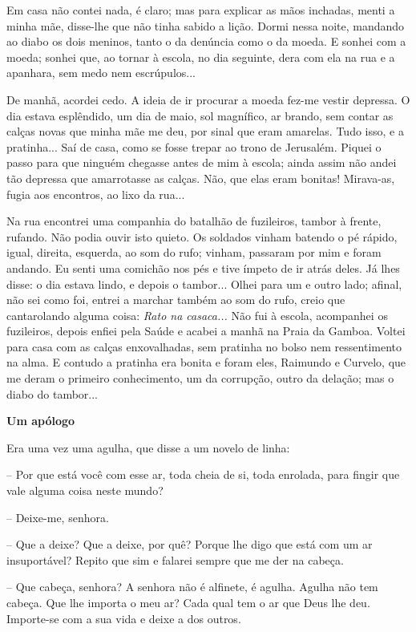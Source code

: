 Em casa não contei nada, é claro; mas para explicar as mãos inchadas,
menti a minha mãe, disse-lhe que não tinha sabido a lição. Dormi nessa
noite, mandando ao diabo os dois meninos, tanto o da denúncia como o da
moeda. E sonhei com a moeda; sonhei que, ao tornar à escola, no dia
seguinte, dera com ela na rua e a apanhara, sem medo nem escrúpulos...

De manhã, acordei cedo. A ideia de ir procurar a moeda fez-me vestir
depressa. O dia estava esplêndido, um dia de maio, sol magnífico, ar
brando, sem contar as calças novas que minha mãe me deu, por sinal que
eram amarelas. Tudo isso, e a pratinha... Saí de casa, como se fosse
trepar ao trono de Jerusalém. Piquei o passo para que ninguém chegasse
antes de mim à escola; ainda assim não andei tão depressa que
amarrotasse as calças. Não, que elas eram bonitas! Mirava-as, fugia aos
encontros, ao lixo da rua...

Na rua encontrei uma companhia do batalhão de fuzileiros, tambor à
frente, rufando. Não podia ouvir isto quieto. Os soldados vinham batendo
o pé rápido, igual, direita, esquerda, ao som do rufo; vinham, passaram
por mim e foram andando. Eu senti uma comichão nos pés e tive ímpeto de
ir atrás deles. Já lhes disse: o dia estava lindo, e depois o tambor...
Olhei para um e outro lado; afinal, não sei como foi, entrei a marchar
também ao som do rufo, creio que cantarolando alguma coisa: \emph{Rato
na casaca...} Não fui à escola, acompanhei os fuzileiros, depois enfiei
pela Saúde e acabei a manhã na Praia da Gamboa. Voltei para casa com as
calças enxovalhadas, sem pratinha no bolso nem ressentimento na alma. E
contudo a pratinha era bonita e foram eles, Raimundo e Curvelo, que me
deram o primeiro conhecimento, um da corrupção, outro da delação; mas o
diabo do tambor...

\textbf{Um apólogo}

Era uma vez uma agulha, que disse a um novelo de linha:

-- Por que está você com esse ar, toda cheia de si, toda enrolada, para
fingir que vale alguma coisa neste mundo?

-- Deixe-me, senhora.

-- Que a deixe? Que a deixe, por quê? Porque lhe digo que está com um ar
insuportável? Repito que sim e falarei sempre que me der na cabeça.

-- Que cabeça, senhora? A senhora não é alfinete, é agulha. Agulha não
tem cabeça. Que lhe importa o meu ar? Cada qual tem o ar que Deus lhe
deu. Importe-se com a sua vida e deixe a dos outros.

